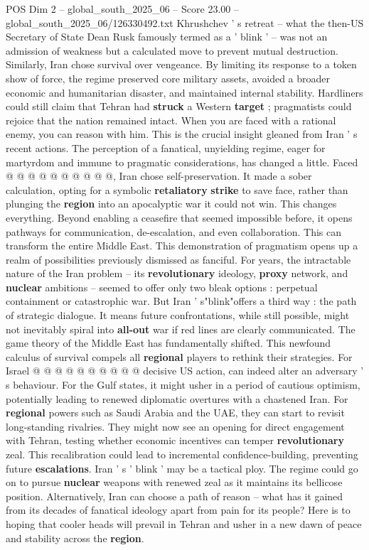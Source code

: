 \begin{textsample}{POS Dim 2 – global\_south\_2025\_06 – Score 23.00 – global\_south\_2025\_06/126330492.txt}
Khrushchev ' s retreat -- what the then-US Secretary of State Dean Rusk famously termed as a ' blink ' -- was not an admission of weakness but a calculated move to prevent mutual destruction.
Similarly, Iran chose survival over vengeance.
By limiting its response to a token show of force, the regime preserved core military assets, avoided a broader economic and humanitarian disaster, and maintained internal stability.
Hardliners could still claim that Tehran had \textbf{struck} a Western \textbf{target} ; pragmatists could rejoice that the nation remained intact.
When you are faced with a rational enemy, you can reason with him.
This is the crucial insight gleaned from Iran ' s recent actions.
The perception of a fanatical, unyielding regime, eager for martyrdom and immune to pragmatic considerations, has changed a little.
Faced @ @ @ @ @ @ @ @ @ @, Iran chose self-preservation.
It made a sober calculation, opting for a symbolic \textbf{retaliatory} \textbf{strike} to save face, rather than plunging the \textbf{region} into an apocalyptic war it could not win.
This changes everything.
Beyond enabling a ceasefire that seemed impossible before, it opens pathways for communication, de-escalation, and even collaboration.
This can transform the entire Middle East.
This demonstration of pragmatism opens up a realm of possibilities previously dismissed as fanciful.
For years, the intractable nature of the Iran problem -- its \textbf{revolutionary} ideology, \textbf{proxy} network, and \textbf{nuclear} ambitions -- seemed to offer only two bleak options : perpetual containment or catastrophic war.
But Iran ' s"blink"offers a third way : the path of strategic dialogue.
It means future confrontations, while still possible, might not inevitably spiral into \textbf{all-out} war if red lines are clearly communicated.
The game theory of the Middle East has fundamentally shifted.
This newfound calculus of survival compels all \textbf{regional} players to rethink their strategies.
For Israel @ @ @ @ @ @ @ @ @ @ decisive US action, can indeed alter an adversary ' s behaviour.
For the Gulf states, it might usher in a period of cautious optimism, potentially leading to renewed diplomatic overtures with a chastened Iran.
For \textbf{regional} powers such as Saudi Arabia and the UAE, they can start to revisit long-standing rivalries.
They might now see an opening for direct engagement with Tehran, testing whether economic incentives can temper \textbf{revolutionary} zeal.
This recalibration could lead to incremental confidence-building, preventing future \textbf{escalations}.
Iran ' s ' blink ' may be a tactical ploy.
The regime could go on to pursue \textbf{nuclear} weapons with renewed zeal as it maintains its bellicose position.
Alternatively, Iran can choose a path of reason -- what has it gained from its decades of fanatical ideology apart from pain for its people?
Here is to hoping that cooler heads will prevail in Tehran and usher in a new dawn of peace and stability across the \textbf{region}.


\end{textsample}
